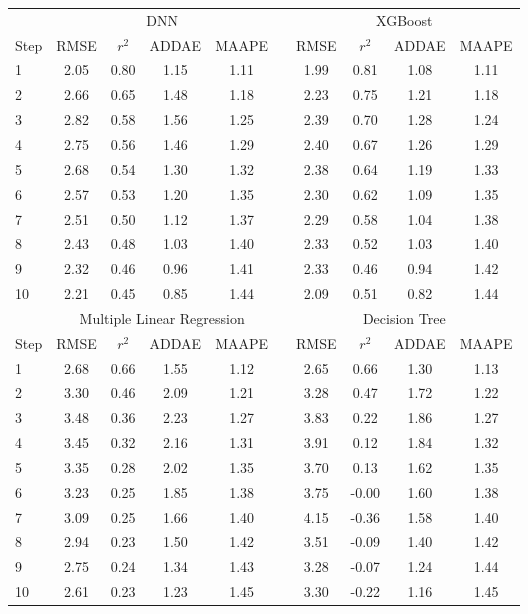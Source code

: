 \documentclass[]{interact}
\theoremstyle{plain}%
\theoremstyle{definition}
\theoremstyle{remark}
\begin{document}
\begin{table}[H]
{\begin{tabular}{lccccccccc} \toprule
  &  \multicolumn{4}{c}{DNN}  & \multicolumn{1}{c}{\quad} & \multicolumn{4}{c}{XGBoost} \\ \cmidrule{2-10}
 Step  &  RMSE  &  $r^2$  &  ADDAE & MAAPE & \quad &  RMSE  &  $r^2$  &  ADDAE & MAAPE \\ \midrule
1 & 2.05 & 0.80 & 1.15 & 1.11 & \quad & 1.99 & 0.81 & 1.08 & 1.11 \\
2 & 2.66 & 0.65 & 1.48 & 1.18 & \quad & 2.23 & 0.75 & 1.21 & 1.18 \\
3 & 2.82 & 0.58 & 1.56 & 1.25 & \quad & 2.39 & 0.70 & 1.28 & 1.24 \\
4 & 2.75 & 0.56 & 1.46 & 1.29 & \quad & 2.40 & 0.67 & 1.26 & 1.29 \\
5 & 2.68 & 0.54 & 1.30 & 1.32 & \quad & 2.38 & 0.64 & 1.19 & 1.33 \\
6 & 2.57 & 0.53 & 1.20 & 1.35 & \quad & 2.30 & 0.62 & 1.09 & 1.35 \\
7 & 2.51 & 0.50 & 1.12 & 1.37 & \quad & 2.29 & 0.58 & 1.04 & 1.38 \\
8 & 2.43 & 0.48 & 1.03 & 1.40 & \quad & 2.33 & 0.52 & 1.03 & 1.40 \\
9 & 2.32 & 0.46 & 0.96 & 1.41 & \quad & 2.33 & 0.46 & 0.94 & 1.42 \\
10 & 2.21 & 0.45 & 0.85 & 1.44 & \quad & 2.09 & 0.51 & 0.82 & 1.44 \\
\bottomrule
  &  \multicolumn{4}{c}{Multiple Linear Regression}  & \multicolumn{1}{c}{\quad} & \multicolumn{4}{c}{Decision Tree} \\ \cmidrule{2-10}
 Step  &  RMSE  &  $r^2$  &  ADDAE & MAAPE & \quad &  RMSE  &  $r^2$  &  ADDAE & MAAPE \\ \midrule
1 & 2.68 & 0.66 & 1.55 & 1.12 & \quad & 2.65 & 0.66 & 1.30 & 1.13 \\ 
2 & 3.30 & 0.46 & 2.09 & 1.21 & \quad & 3.28 & 0.47 & 1.72 & 1.22 \\ 
3 & 3.48 & 0.36 & 2.23 & 1.27 & \quad & 3.83 & 0.22 & 1.86 & 1.27 \\ 
4 & 3.45 & 0.32 & 2.16 & 1.31 & \quad & 3.91 & 0.12 & 1.84 & 1.32 \\ 
5 & 3.35 & 0.28 & 2.02 & 1.35 & \quad & 3.70 & 0.13 & 1.62 & 1.35 \\ 
6 & 3.23 & 0.25 & 1.85 & 1.38 & \quad & 3.75 & -0.00 & 1.60 & 1.38 \\ 
7 & 3.09 & 0.25 & 1.66 & 1.40 & \quad & 4.15 & -0.36 & 1.58 & 1.40 \\ 
8 & 2.94 & 0.23 & 1.50 & 1.42 & \quad & 3.51 & -0.09 & 1.40 & 1.42 \\ 
9 & 2.75 & 0.24 & 1.34 & 1.43 & \quad & 3.28 & -0.07 & 1.24 & 1.44 \\ 
10 & 2.61 & 0.23 & 1.23 & 1.45 & \quad & 3.30 & -0.22 & 1.16 & 1.45 \\ 
\bottomrule
\end{tabular}}
\label{table:DepartureDeviationPrediction}
\end{table}
\end{document}
